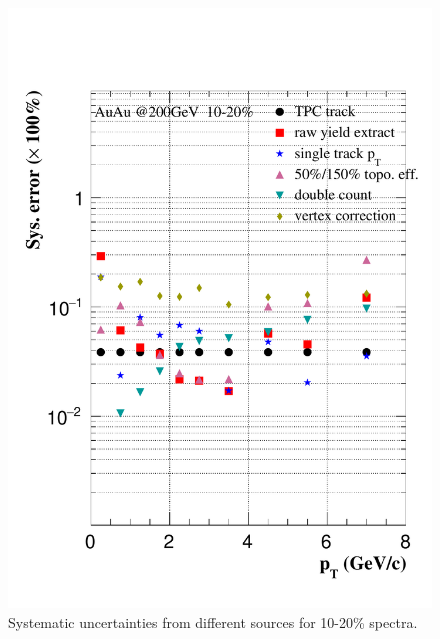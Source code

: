 \begin{figure}[htbp]
\begin{minipage}[htbp]{0.47\linewidth}
\includegraphics[width=1.0\textwidth,angle=0]{figure/Run14_D0HFT/sysErr_10_20_Rcp1.pdf} 
\caption{ Systematic uncertainties from different sources for 10-20\% spectra. \label{sysErr_10_20_Rcp1}}
\end{minipage}
\end{figure}

